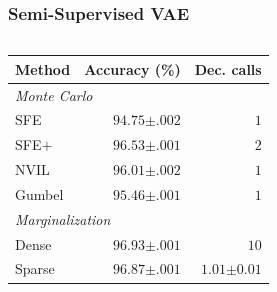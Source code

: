 \documentclass[xetex,aspectratio=169,xcolor,professionalfonts,hyperref]{beamer}
\begin{document}
\begin{frame}
    \frametitle{Semi-Supervised VAE}
    \begin{columns}[T]
    \begin{column}{.53\textwidth}
        \centering\small%
        \begin{tabular}{lrr}
            \toprule
            Method &
            Accuracy (\%)
            & Dec. calls\\
            \midrule
        \multicolumn{3}{l}{\emph{Monte Carlo}} \\
            SFE
            & $94.75${\tiny\color{gray}$\pm .002$} & $1$ \\
            SFE$+$
            & $96.53${\tiny\color{gray}$\pm .001$}  & $2$  \\
            NVIL
            & $96.01${\tiny\color{gray}$\pm .002$}  & $1$  \\
            Gumbel
            & $95.46${\tiny\color{gray}$\pm .001$}  & $1$  \\
            \midrule
        \multicolumn{3}{l}{\emph{Marginalization}} \\
            Dense
            & $96.93${\tiny\color{gray}$\pm .001$}  & $10$  \\
            Sparse {\small \color{gray}{(proposed)}}
            & $96.87${\tiny\color{gray}$\pm .001$}  & $1.01${\tiny\color{gray}$\pm 0.01$}  \\
            \bottomrule
            \end{tabular}
    \end{column}
    \begin{column}{.47\textwidth}
        \fontsize{10pt}{10}\selectfont\centering%
    \end{column}
    \end{columns}
\end{frame}
\end{document}
